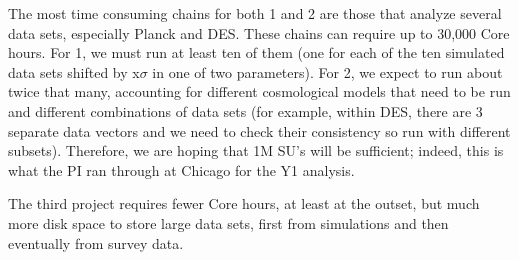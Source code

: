 \documentclass[12pt]{article}
\begin{document}
\begin{small}
The most time consuming chains for both 1 and 2 are those that analyze several data sets, especially Planck and DES. These chains can require up to 30,000 Core hours. For 1, we must run at least ten of them (one for each of the ten simulated data sets shifted by x$\sigma$ in one of two parameters). For 2, we expect to run about twice that many, accounting for different cosmological models that need to be run and different combinations of data sets (for example, within DES, there are 3 separate data vectors and we need to check their consistency so run with different subsets). Therefore, we are hoping that 1M SU's will be sufficient; indeed, this is what the PI ran through at Chicago for the Y1 analysis.

The third project requires fewer Core hours, at least at the outset, but much more disk space to store large data sets, first from simulations and then eventually from survey data. 



\end{small}
\end{document}

